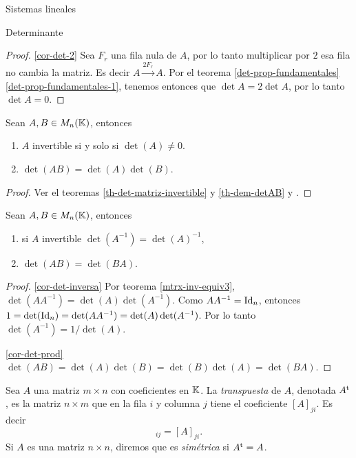 \begin{chapter}{Sistemas lineales}
\begin{section}{Determinante}
\begin{proof}
        \ref{cor-det-2} Sea $F_r$ una fila nula de $A$, por lo tanto multiplicar por $2$ esa fila no cambia la matriz. Es decir $A  \stackrel{2F_r}{\longrightarrow} A$. Por el teorema \ref{det-prop-fundamentales} \ref{det-prop-fundamentales-1}, tenemos entonces que $\det A = 2\det A$, por lo tanto  $\det A =0$.
    \end{proof}
    
    
    
    \begin{teorema} \label{mtrx-inv-equiv3} Sean $A,B \in M_n(\mathbb K)$, entonces
        \begin{enumerate}
            \item $A$ invertible si y solo si  $\det(A)\ne0$.
            \item $\det (A B) = \det(A)\det(B)$. 
        \end{enumerate}
    \end{teorema}
\begin{proof}
    Ver el teoremas \ref{th-det-matriz-invertible} y \ref{th-dem-detAB} y .
\end{proof}

    \begin{corolario}  Sean $A,B \in M_n(\mathbb K)$, entonces
        \begin{enumerate}
            \item\label{cor-det-inversa} si $A$ invertible $\det(A^{-1}) = \det(A)^{-1}$,
            \item\label{cor-det-prod} $\det (AB) = \det(BA)$.
            \end{enumerate}
    \end{corolario} 
    \begin{proof} 

        \ref{cor-det-inversa}  Por teorema \ref{mtrx-inv-equiv3}, $\det(AA^{-1}) = \det(A)\det(A^{-1})$. Como $AA^{-1} = \operatorname{Id}_n$, entonces $1 =\det(\operatorname{Id}_n) =  \det(AA^{-1}) = \det(A)\det(A^{-1})$. Por lo tanto  $\det(A^{-1}) = 1/\det(A)$.

        \ref{cor-det-prod}
        $\det (AB) = \det(A)\det(B) = \det(B)\det(A) = \det(BA)$.
    \end{proof}

    \begin{definicion}\label{def-transpuesta-simetrica}
        Sea $A$ una matriz $m \times n$ con coeficientes en $\mathbb K$. La \textit{transpuesta} de $A$, denotada $A^{\operatorname{t}}$, es la matriz  $n \times m$ que en la fila $i$ y columna $j$ tiene el coeficiente $[A]_{ji}$. Es decir
        \begin{equation*}
        [A^\t]_{ij} = [A]_{ji}.
        \end{equation*} 
        Si $A$ es una matriz $n \times n$, diremos que es \textit{simétrica} si $A^{\operatorname{t}} = A$. 
    \end{definicion}
    

\end{section}
\end{chapter}
